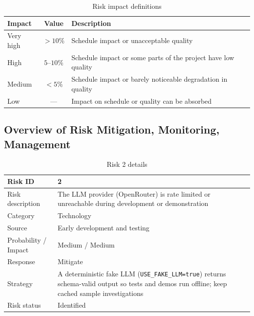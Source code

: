 \documentclass[oneside,a4paper,12pt]{report}
\begin{document}
\begin{table}[H]
\centering
\begin{tabularx}{\textwidth}{|l|c|X|}
\hline
Impact & Value & Description \\ \hline
Very high & $> 10\%$ & Schedule impact or unacceptable quality \\ \hline
High & $5$--$10\%$ & Schedule impact or some parts of the project have low quality \\ \hline
Medium & $< 5\%$ & Schedule impact or barely noticeable degradation in quality \\ \hline
Low & --- & Impact on schedule or quality can be absorbed \\ \hline
\end{tabularx}
\caption{Risk impact definitions \cite{bookPressman}}
\label{tab:riskImpactDef}
\end{table}

\subsection{Overview of Risk Mitigation, Monitoring, Management}
\begin{table}[H]
\centering
\begin{tabularx}{\textwidth}{|l|X|}
\hline
Risk ID & 2 \\ \hline
Risk description & The LLM provider (OpenRouter) is rate limited or unreachable during development or demonstration \\ \hline
Category & Technology \\ \hline
Source & Early development and testing \\ \hline
Probability / Impact & Medium / Medium \\ \hline
Response & Mitigate \\ \hline
Strategy & A deterministic fake LLM (\texttt{USE\_FAKE\_LLM=true}) returns schema-valid output so tests and demos run offline; keep cached sample investigations \\ \hline
Risk status & Identified \\ \hline
\end{tabularx}
\caption{Risk 2 details}
\end{table}
\end{document}
